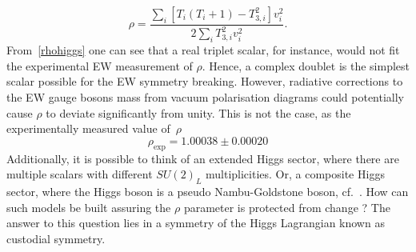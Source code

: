 \begin{equation}
    \rho =\frac{\sum_i [T_{i}(T_{i}+1)-T_{3,i}^2]v_i^2}{2\sum_i T_{3,i}^2v_i^2}.
    \label{rhohiggs}
\end{equation}
From~\eqref{rhohiggs} one can see that a real triplet scalar, for instance, would not fit the experimental EW measurement of $\rho$. Hence, a complex doublet is the simplest scalar possible for the EW symmetry breaking. However, radiative corrections to the EW gauge bosons mass from vacuum polarisation diagrams could potentially cause $\rho$ to deviate significantly from unity.  This is not the case, as the experimentally measured value of~$\rho$~\cite{Zyla:2020zbs}
\begin{equation}
    \rho_{\text{exp}} = 1.00038 \pm 0.00020
    \label{eq:rhoexp}
\end{equation}
Additionally, it is possible to think of an extended Higgs sector, where there are multiple scalars with different $SU(2)_L$ multiplicities. Or, a composite Higgs sector, where the Higgs boson is a pseudo Nambu-Goldstone boson, cf.~\cite{Dugan1985AnatomyOA,Hill:2002ap}. How can such models be built assuring the $\rho$ parameter is protected from change ? The answer to this question lies in a symmetry of the Higgs Lagrangian known as custodial symmetry. 
